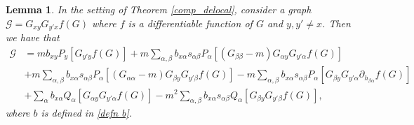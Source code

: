 \documentclass{article}
\newcommand{\1}{\mathds{1}}
\numberwithin{equation}{section}
\newcommand{\al}{\alpha}
\newcommand{\be}{\begin{equation}}
\newcommand{\ee}{\end{equation}}
\renewcommand{\cal}{\mathcal}
\theoremstyle{plain} %
\newtheorem{lemma}[theorem]{Lemma}
\theoremstyle{remark}
\begin{document}
  \begin{lemma} \label{T eq0}
In the setting of Theorem \ref{comp_delocal}, consider a graph $\cal G= G_{xy}   G_{y' x }  f (G)$ where $f$ is a differentiable function of $G$ and $y,y'\ne x$. Then we have that 
\be\label{G2fH}
\begin{split} 
 \cal G   &  =   m b_{xy} P_y\left[ G_{y' y} f(G)\right]  +m \sum_{\al,\beta}  b_{x\al} s_{\al\beta}P_\al\left[  (G_{\beta \beta}-m)  G_{\al y}   G_{y' \al }  f (G)\right]  \\
 & + m \sum_{\al,\beta}  b_{x\al} s_{\al\beta} P_\al\left[ (G_{\al\al}-m)   G_{\beta y}   G_{y' \beta }  f (G)\right]- m \sum_{\al,\beta} b_{x\al}    s_{\al\beta}P_\al\left[ G_{\beta y} G_{y' \al} \partial_{ h_{\beta \al}}f(G)\right]\\
  & + \sum_\al b_{x\al}  Q_\al\left[G_{\al y}   G_{y' \al}  f (G)\right]   - m^2 \sum_{\al, \beta}b_{x\al} s_{\al\beta}  Q_\al\left[ G_{\beta y}   G_{y' \beta }  f (G)\right] ,
 \end{split} 
 \ee 
where $b$ is  defined in \eqref{defn b}.
\end{lemma} 
\end{document}
